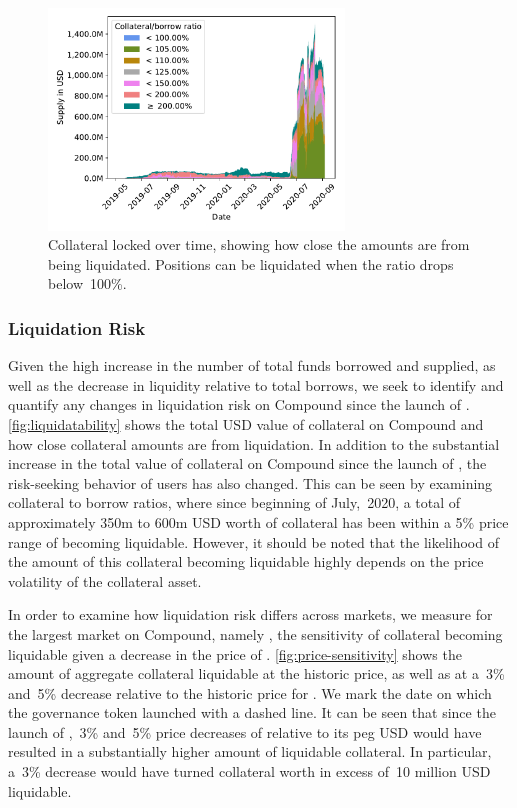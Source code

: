 \begin{figure}[tbp]
  \centering
  \includegraphics[width=0.7\textwidth]{./5b-economic-security/figures/supply-borrow-over-time.pdf}
  \caption{Collateral locked over time, showing how close the amounts are from being liquidated. Positions can be liquidated when the ratio drops below~100\%.}
  \label{fig:liquidatability}
\end{figure}

\subsubsection{Liquidation Risk}
Given the high increase in the number of total funds borrowed and supplied, as well as the decrease in liquidity relative to total borrows, we seek to identify and quantify any changes in liquidation risk on Compound since the launch of . 
\autoref{fig:liquidatability} shows the total USD value of collateral on Compound and how close collateral amounts are from liquidation. 
In addition to the substantial increase in the total value of collateral on Compound since the launch of , the risk-seeking behavior of users has also changed.
This can be seen by examining collateral to borrow ratios, where since beginning of July,~2020, a total of approximately 350m to 600m USD worth of collateral has been within a 5\% price range of becoming liquidable.
However, it should be noted that the likelihood of the amount of this collateral becoming liquidable highly depends on the price volatility of the collateral asset.

In order to examine how liquidation risk differs across markets, we measure for the largest market on Compound, namely , the sensitivity of collateral becoming liquidable given a decrease in the price of .
\autoref{fig:price-sensitivity} shows the amount of aggregate collateral liquidable at the historic price, as well as at a~3\% and~5\% decrease relative to the historic price for .
We mark the date on which the  governance token launched with a dashed line.
It can be seen that since the launch of ,~3\% and~5\% price decreases of  relative to its peg USD would have resulted in a substantially higher amount of liquidable collateral.
In particular, a~3\% decrease would have turned collateral worth in excess of~10 million USD liquidable.

